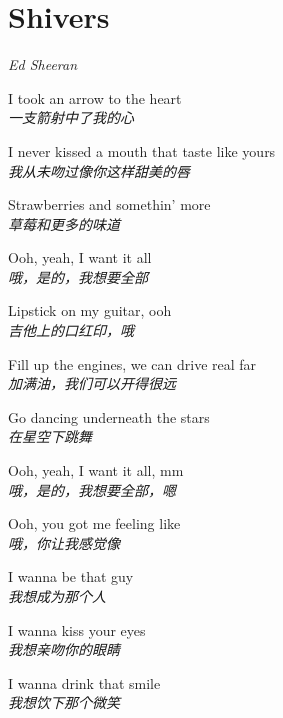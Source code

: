 \section{Shivers}

\thispagestyle{empty}


\begin{center}
\textit{Ed Sheeran}
\end{center}

\vspace{1em}

\begin{spacing}{1.5}
\begin{flushleft}
I took an arrow to the heart\\
\textit{一支箭射中了我的心}\lyricspace

I never kissed a mouth that taste like yours\\
\textit{我从未吻过像你这样甜美的唇}\lyricspace

Strawberries and somethin' more\\
\textit{草莓和更多的味道}\lyricspace

Ooh, yeah, I want it all\\
\textit{哦，是的，我想要全部}\lyricspace

Lipstick on my guitar, ooh\\
\textit{吉他上的口红印，哦}\lyricspace

Fill up the engines, we can drive real far\\
\textit{加满油，我们可以开得很远}\lyricspace

Go dancing underneath the stars\\
\textit{在星空下跳舞}\lyricspace

Ooh, yeah, I want it all, mm\\
\textit{哦，是的，我想要全部，嗯}\lyricspace

Ooh, you got me feeling like\\
\textit{哦，你让我感觉像}\lyricspace

I wanna be that guy\\
\textit{我想成为那个人}\lyricspace

I wanna kiss your eyes\\
\textit{我想亲吻你的眼睛}\lyricspace

I wanna drink that smile\\
\textit{我想饮下那个微笑}\lyricspace


\end{flushleft}
\end{spacing}
